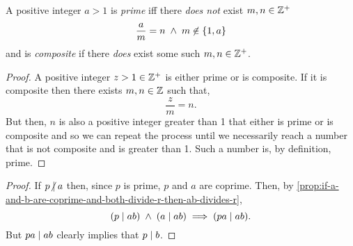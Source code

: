 \documentclass[../MathsNotesBase.tex]{subfiles}
\begin{document}
{{		A positive integer ${ a > 1 }$ is \textit{prime} iff there \textit{does not} exist ${ m, n \in \mathbb{Z}^{+} }$
			\[ \frac{a}{m} = n \; \land \; m \centernot\in \{1,a\} \]
		and is \textit{composite} if there \textit{does} exist some such ${ m, n \in \mathbb{Z}^{+} }$.
		}
		
	
		\biggerskip
		\begin{proof}
			A positive integer ${ z > 1 \in \mathbb{Z}^{+} }$ is either prime or is composite. If it is composite then there exists ${ m,n \in \mathbb{Z}^{} }$ such that,
			\[ \frac{z}{m} = n. \]
			But then, $n$ is also a positive integer greater than 1 that either is prime or is composite and so we can repeat the process until we necessarily reach a number that is not composite and is greater than 1. Such a number is, by definition, prime.
		\end{proof}
	
		\bigskip
		\begin{proof}
			If ${ p \centernot\divides a }$ then, since $p$ is prime, $p$ and $a$ are coprime. Then, by \autoref{prop:if-a-and-b-are-coprime-and-both-divide-r-then-ab-divides-r},
			\[ (p \mid ab) \; \land \; (a \mid ab) \implies (pa \mid ab). \]
			But ${ pa \mid ab }$ clearly implies that ${ p \mid b }$.
		\end{proof}
		
}
\end{document}
